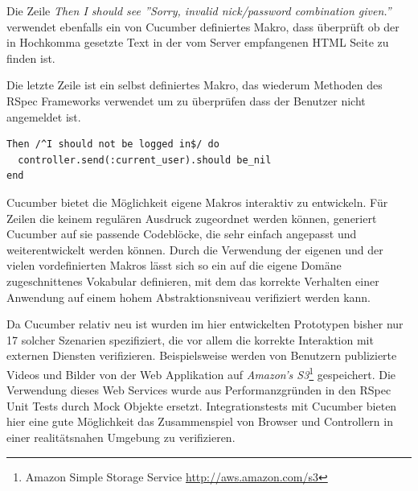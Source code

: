 Die Zeile \textit{Then I should see ''Sorry, invalid nick/password
  combination given.''} verwendet ebenfalls ein von Cucumber
definiertes Makro, dass überprüft ob der in Hochkomma gesetzte Text in
der vom Server empfangenen HTML Seite zu finden ist.

Die letzte Zeile ist ein selbst definiertes Makro, das wiederum
Methoden des RSpec Frameworks verwendet um zu überprüfen dass der
Benutzer nicht angemeldet ist.

\begin{lstlisting}
Then /^I should not be logged in$/ do
  controller.send(:current_user).should be_nil
end
\end{lstlisting}

Cucumber bietet die Möglichkeit eigene Makros interaktiv zu
entwickeln. Für Zeilen die keinem regulären Ausdruck zugeordnet werden
können, generiert Cucumber auf sie passende Codeblöcke, die sehr
einfach angepasst und weiterentwickelt werden können. Durch die
Verwendung der eigenen und der vielen vordefinierten Makros lässt sich
so ein auf die eigene Domäne zugeschnittenes Vokabular definieren, mit
dem das korrekte Verhalten einer Anwendung auf einem hohem
Abstraktionsniveau verifiziert werden kann.

Da Cucumber relativ neu ist wurden im hier entwickelten Prototypen
bisher nur 17 solcher Szenarien spezifiziert, die vor allem die
korrekte Interaktion mit externen Diensten
verifizieren. Beispielsweise werden von Benutzern publizierte Videos
und Bilder von der Web Applikation auf \textit{Amazon's
  S3}\footnote{Amazon Simple Storage Service
  \url{http://aws.amazon.com/s3}} gespeichert. Die Verwendung dieses
Web Services wurde aus Performanzgründen in den RSpec Unit Tests durch
Mock Objekte ersetzt. Integrationstests mit Cucumber bieten hier eine
gute Möglichkeit das Zusammenspiel von Browser und Controllern in
einer realitätsnahen Umgebung zu verifizieren.

